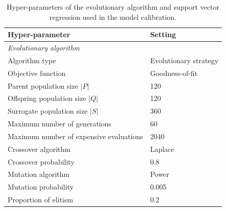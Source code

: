 \begin{table}[h]
\footnotesize
\begin{center}
\caption{Hyper-parameters of the evolutionary algorithm and support vector regression used in the model calibration.}
\label{my-label}
\begin{tabular}{ll}
\toprule
Hyper-parameter                         & Setting                        \\ \hline
\rule{0pt}{4ex}\textit{Evolutionary algorithm}\vspace{6pt}         &                                \\
\hspace{9pt}Algorithm type                          & Evolutionary strategy          \\
\hspace{9pt}Objective function                      & Goodness-of-fit                \\
\hspace{9pt}Parent population size $|P|$              & 120                            \\
\hspace{9pt}Offspring population size $|Q|$           & 120                            \\
\hspace{9pt}Surrogate population size $|S|$           & 360                            \\
\hspace{9pt}Maximum number of generations           & 60                             \\
\hspace{9pt}Maximum number of expensive evaluations & 2040                           \\
\hspace{9pt}Crossover algorithm                     & Laplace                        \\
\hspace{9pt}Crossover probability                   & 0.8                            \\
\hspace{9pt}Mutation algorithm                      & Power                          \\
\hspace{9pt}Mutation probability                    & 0.005                          \\
\hspace{9pt}Proportion of elitism                   & 0.2       \vspace{6pt}                    \\

\end{tabular}
\end{center}
\end{table}
